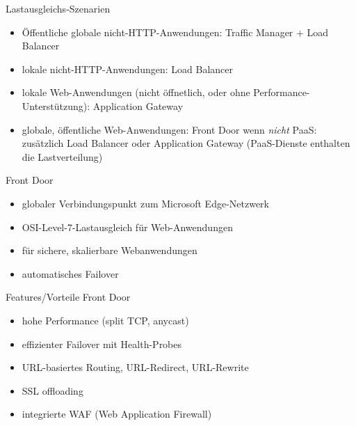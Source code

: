 \begin{flashcard}[]{Lastausgleichs-Szenarien}
  \begin{itemize}
    \item Öffentliche globale nicht-HTTP-Anwendungen: Traffic Manager + Load Balancer
    \item lokale nicht-HTTP-Anwendungen: Load Balancer
    \item lokale Web-Anwendungen (nicht öffnetlich, oder ohne Performance-Unterstützung): Application Gateway
    \item globale, öffentliche Web-Anwendungen: Front Door\newline
      wenn \emph{nicht} PaaS: zusätzlich Load Balancer oder Application Gateway\newline
      (PaaS-Dienste enthalten die Lastverteilung)
  \end{itemize}
\end{flashcard}

\begin{flashcard}[]{Front Door}
  \begin{itemize}
    \item globaler Verbindungspunkt zum Microsoft Edge-Netzwerk
    \item OSI-Level-7-Lastausgleich für Web-Anwendungen
    \item für sichere, skalierbare Webanwendungen
    \item automatisches Failover
  \end{itemize}
\end{flashcard}

\begin{flashcard}[]{Features/Vorteile Front Door}
  \begin{itemize}
    \item hohe Performance (split TCP, anycast)
    \item effizienter Failover mit Health-Probes
    \item URL-basiertes Routing, URL-Redirect, URL-Rewrite
    \item SSL offloading
    \item integrierte WAF (Web Application Firewall)
  \end{itemize}
\end{flashcard}

